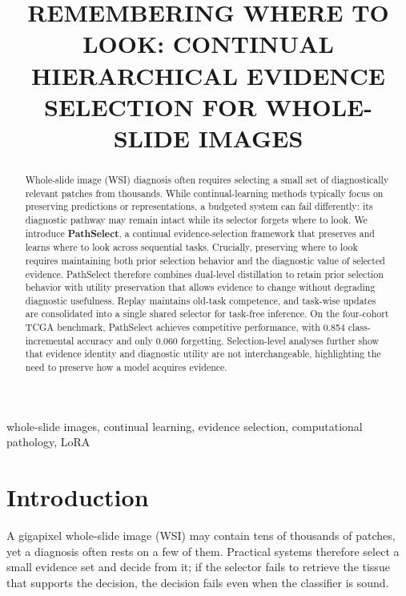 \documentclass{article}
\title{REMEMBERING WHERE TO LOOK: CONTINUAL HIERARCHICAL EVIDENCE SELECTION FOR WHOLE-SLIDE IMAGES}
\begin{document}
\ninept
\maketitle

\begin{abstract}
Whole-slide image (WSI) diagnosis often requires selecting a small set of diagnostically relevant patches from thousands. While continual-learning methods typically focus on preserving predictions or representations, a budgeted system can fail differently: its diagnostic pathway may remain intact while its selector forgets where to look. We introduce \textbf{PathSelect}, a continual evidence-selection framework that preserves and learns where to look across sequential tasks. Crucially, preserving where to look requires maintaining both prior selection behavior and the diagnostic value of selected evidence. PathSelect therefore combines dual-level distillation to retain prior selection behavior with utility preservation that allows evidence to change without degrading diagnostic usefulness. Replay maintains old-task competence, and task-wise updates are consolidated into a single shared selector for task-free inference. On the four-cohort TCGA benchmark, PathSelect achieves competitive performance, with 0.854 class-incremental accuracy and only 0.060 forgetting. Selection-level analyses further show that evidence identity and diagnostic utility are not interchangeable, highlighting the need to preserve how a model acquires evidence.
\end{abstract}

\begin{keywords}
whole-slide images, continual learning, evidence selection, computational pathology, LoRA
\end{keywords}

\section{Introduction}
\label{sec:intro}

A gigapixel whole-slide image (WSI) may contain tens of thousands of patches, yet a diagnosis often rests on a few of them. Practical systems therefore select a small evidence set and decide from it; if the selector fails to retrieve the tissue that supports the decision, the decision fails even when the classifier is sound.
\end{document}

